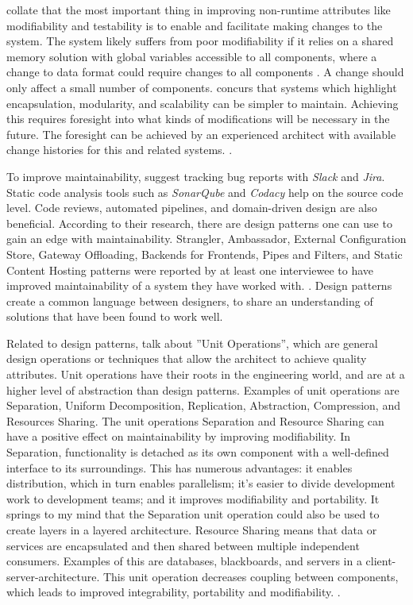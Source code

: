 \documentclass[utf8,english]{gradu3}
\begin{document}
\textcite{Bass1998} collate that the most important thing in improving
non-runtime attributes like modifiability and testability is to enable and
facilitate making changes to the system. The system likely suffers from poor
modifiability if it relies on a shared memory solution with global variables
accessible to all components, where a change to data format could require
changes to all components \parencite[89]{Bass1998}. A change should only affect
a small number of components. \textcite[96]{IEEE12207} concurs that systems
which highlight encapsulation, modularity, and scalability can be simpler to
maintain. Achieving this requires foresight into what kinds of modifications
will be necessary in the future. The foresight can be achieved by an experienced
architect with available change histories for this and related systems.
\parencite[118]{Bass1998}.

To improve maintainability, \textcite[7]{Vale2022} suggest tracking bug reports
with \textit{Slack} and \textit{Jira}. Static code analysis tools such as
\textit{SonarQube} and \textit{Codacy} help on the source code level. Code
reviews, automated pipelines, and domain-driven design are also beneficial.
According to their research, there are design patterns one can use to gain an
edge with maintainability. Strangler, Ambassador, External Configuration Store,
Gateway Offloading, Backends for Frontends, Pipes and Filters, and Static Content
Hosting patterns were reported by at least one interviewee to have improved
maintainability of a system they have worked with. \parencite[4-6]{Vale2022}.
Design patterns create a common language between designers, to share an
understanding of solutions that have been found to work well.

Related to design patterns, \textcite{Bass1998} talk about ''Unit Operations'',
which are general design operations or techniques that allow the
architect to achieve quality attributes. Unit operations have their roots in the
engineering world, and are at a higher level of abstraction than design
patterns. Examples of unit operations are Separation, Uniform Decomposition,
Replication, Abstraction, Compression, and Resources Sharing. The unit operations
Separation and Resource Sharing can have a positive effect on maintainability
by improving modifiability. In Separation, functionality is
detached as its own component with a well-defined interface to its surroundings.
This has numerous advantages: it enables distribution, which in turn enables
parallelism; it's easier to divide development work to development teams; and it
improves modifiability and portability. It springs to my mind that the Separation
unit operation could also be used to create layers in a layered architecture.
Resource Sharing means that data or services are encapsulated and then
shared between multiple independent consumers. Examples of this are databases,
blackboards, and servers in a client-server-architecture. This unit operation
decreases coupling between components, which leads to improved integrability,
portability and modifiability. \parencite[123-126]{Bass1998}.
\end{document}
